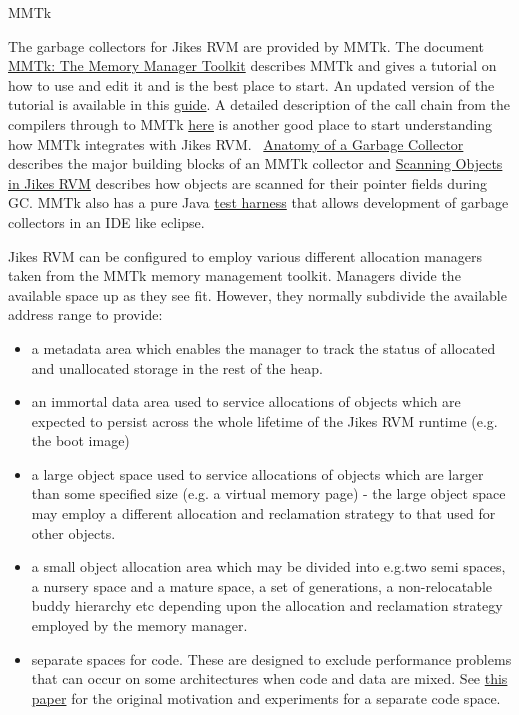 \begin{chapter}{MMTk}
\label{cha:mmtk}

The garbage collectors for Jikes RVM are provided by MMTk. The document \href{http://cs.anu.edu.au/~Robin.Garner/mmtk-guide.pdf}{MMTk: The Memory Manager Toolkit} describes MMTk and gives a tutorial on how to use and edit it and is the best place to start.  An updated version of the tutorial is available in this \hyperref[part:mmtktutorial]{guide}. A detailed description of the call chain from the compilers through to MMTk \hyperref[sec:memoryallocationinjikesrvm]{here} is another good place to start understanding how MMTk integrates with Jikes RVM.  \hyperref[sec:anatomyofagarbagecollector]{Anatomy of a Garbage Collector} describes the major building blocks of an MMTk collector and \hyperref[sec:scanningobjectsinjikesrvm]{Scanning Objects in Jikes RVM} describes how objects are scanned for their pointer fields during GC.  MMTk also has a pure Java \hyperref[cha:themmtktestharness]{test harness} that allows development of garbage collectors in an IDE like eclipse.

Jikes RVM can be configured to employ various different allocation managers taken from the MMTk memory management toolkit. Managers divide the available space up as they see fit. However, they normally subdivide the available address range to provide:
\begin{itemize}
  \item a metadata area which enables the manager to track the status of allocated and unallocated storage in the rest of the heap.
  \item an immortal data area used to service allocations of objects which are expected to persist across the whole lifetime of the Jikes RVM runtime (e.g. the boot image)
  \item a large object space used to service allocations of objects which are larger than some specified size (e.g. a virtual memory page) - the large object space may employ a different allocation and reclamation strategy to that used for other objects.
  \item a small object allocation area which may be divided into e.g.two semi spaces, a nursery space and a mature space, a set of generations, a non-relocatable buddy hierarchy etc depending upon the allocation and reclamation strategy employed by the memory manager.
  \item separate spaces for code. These are designed to exclude performance problems that can occur on some architectures when code and data are mixed. See \href{http://dl.acm.org/citation.cfm?doid=1133956.1133980}{this paper} for the original motivation and experiments for a separate code space.
\end{itemize}


\end{chapter}
